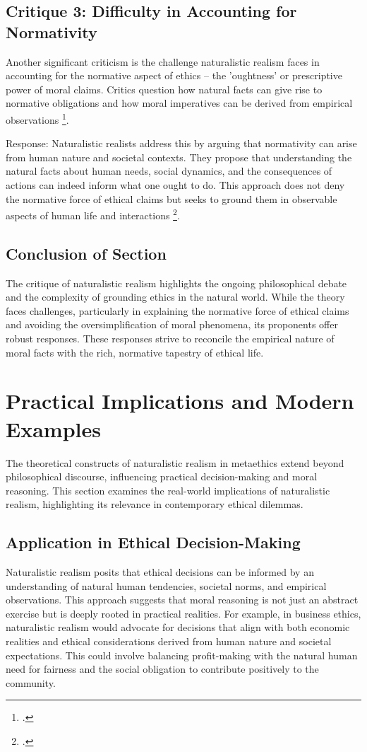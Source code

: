 \documentclass[12pt,a4paper]{article}
\begin{document}
\subsection{Critique 3: Difficulty in Accounting for Normativity}
Another significant criticism is the challenge naturalistic realism faces in accounting for the normative aspect of ethics – the 'oughtness' or prescriptive power of moral claims. Critics question how natural facts can give rise to normative obligations and how moral imperatives can be derived from empirical observations \footcite[]{McPherson2012}.

Response: Naturalistic realists address this by arguing that normativity can arise from human nature and societal contexts. They propose that understanding the natural facts about human needs, social dynamics, and the consequences of actions can indeed inform what one ought to do. This approach does not deny the normative force of ethical claims but seeks to ground them in observable aspects of human life and interactions \footcite[339-362]{Stringer2018}.

\subsection{Conclusion of Section}
The critique of naturalistic realism highlights the ongoing philosophical debate and the complexity of grounding ethics in the natural world. While the theory faces challenges, particularly in explaining the normative force of ethical claims and avoiding the oversimplification of moral phenomena, its proponents offer robust responses. These responses strive to reconcile the empirical nature of moral facts with the rich, normative tapestry of ethical life.

\section{Practical Implications and Modern Examples}

The theoretical constructs of naturalistic realism in metaethics extend beyond philosophical discourse, influencing practical decision-making and moral reasoning. This section examines the real-world implications of naturalistic realism, highlighting its relevance in contemporary ethical dilemmas.

\subsection{Application in Ethical Decision-Making}
Naturalistic realism posits that ethical decisions can be informed by an understanding of natural human tendencies, societal norms, and empirical observations. This approach suggests that moral reasoning is not just an abstract exercise but is deeply rooted in practical realities. For example, in business ethics, naturalistic realism would advocate for decisions that align with both economic realities and ethical considerations derived from human nature and societal expectations. This could involve balancing profit-making with the natural human need for fairness and the social obligation to contribute positively to the community.
\end{document}
